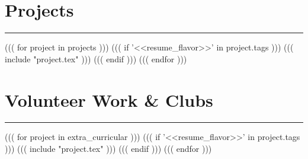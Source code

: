 \documentclass[letterpaper]{article}
\newcommand\textstyleMainColor[1]{\textcolor{toolPrimaryText}{#1}}
\begin{document}
\clearpage

\section{\textstyleMainColor{Projects}}
\hrule height 0.2pt
\vspace{2pt}
((( for project in projects )))
((( if '<<resume_flavor>>' in project.tags )))
((( include "project.tex" )))
((( endif )))
((( endfor )))

\section{\textstyleMainColor{Volunteer Work \& Clubs}}
\hrule height 0.2pt
\vspace{2pt}
((( for project in extra_curricular )))
((( if '<<resume_flavor>>' in project.tags )))
((( include "project.tex" )))
((( endif )))
((( endfor )))
\end{document}
